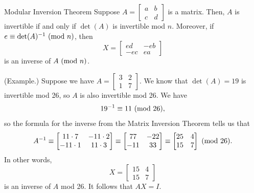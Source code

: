 \documentclass[letterpaper]{article}
\begin{document}
\begin{theorem}{Modular Inversion Theorem}{}
    Suppose $A = \begin{bmatrix}
        a & b \\ c & d
    \end{bmatrix}$ is a matrix. Then, $A$ is invertible if and only if $\det(A)$ is invertible mod $n$. Moreover, if $e \equiv \det(A)^{-1} \ (\mathrm{mod}\ n)$, then \[X = \begin{bmatrix}
        ed & -eb \\ 
        -ec & ea
    \end{bmatrix}\] is an inverse of $A \ (\mathrm{mod}\ n)$. 
\end{theorem}

\begin{mdframed}
    (Example.) Suppose we have $A = \begin{bmatrix}
        3 & 2 \\ 1 & 7
    \end{bmatrix}$. We know that $\det(A) = 19$ is invertible mod 26, so $A$ is also invertible mod 26. We have \[19^{-1} \equiv 11 \ (\mathrm{mod}\ 26),\] so the formula for the inverse from the Matrix Inversion Theorem tells us that \[A^{-1} \equiv \begin{bmatrix}
        11 \cdot 7 & -11 \cdot 2 \\ -11 \cdot 1 & 11 \cdot 3 
    \end{bmatrix} \equiv \begin{bmatrix}
        77 & -22 \\ -11 & 33
    \end{bmatrix} \equiv \begin{bmatrix}
        25 & 4 \\ 15 & 7
    \end{bmatrix} \ (\mathrm{mod}\ 26).\] In other words, \[X = \begin{bmatrix}
        15 & 4 \\ 15 & 7
    \end{bmatrix}\] is an inverse of $A$ mod 26. It follows that $AX = I$. 
\end{mdframed}
\end{document}
